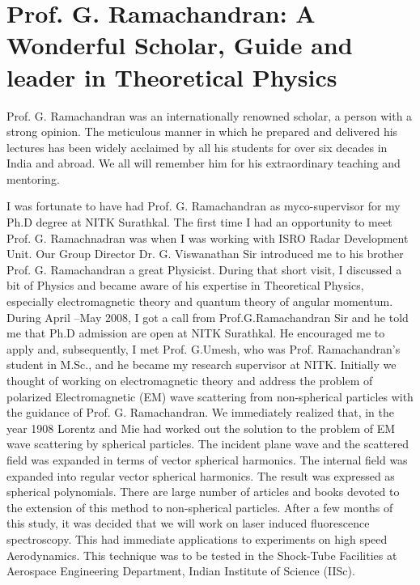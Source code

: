 \chapter[A Wonderful Scholar, Guide and leader in Theoretical Physics]{Prof. G. Ramachandran: A Wonderful Scholar, Guide and leader in Theoretical Physics}

\vspace{-.4cm}

Prof. G. Ramachandran was an internationally renowned scholar, a person with a strong opinion. The meticulous manner in which he prepared and delivered his lectures has been widely acclaimed by all his students for over six decades in India and abroad. We all will remember him for his extraordinary teaching and mentoring.

\medskip

I was fortunate to have had Prof. G. Ramachandran as my\break co-supervisor for my Ph.D degree at NITK Surathkal. The first time I had an opportunity to meet Prof. G. Ramachnadran was when I was working with ISRO Radar Development Unit. Our Group Director Dr. G. Viswanathan Sir introduced me to his brother Prof. G. Ramachandran a great Physicist. During that short visit, I discussed a bit of Physics and became aware of his expertise in Theoretical Physics, especially electromagnetic theory and quantum theory of angular momentum. During April --May 2008, I got a call from Prof.G.Ramachandran Sir and he told me that Ph.D admission are open at NITK Surathkal. He encouraged me to apply and, subsequently, I met Prof. G.Umesh, who was Prof. Ramachandran's student in M.Sc., and he became my research supervisor at NITK. Initially we thought of working on electromagnetic theory and address the problem of polarized Electromagnetic (EM) wave scattering from non-spherical particles with the guidance of Prof. G. Ramachandran. We immediately realized that, in the year 1908 Lorentz and Mie had worked out the solution to the problem of EM wave scattering by spherical particles. The incident plane wave and the scattered field was expanded in terms of vector spherical harmonics. The internal field was expanded into regular vector spherical harmonics. The result was expressed as spherical polynomials. There are large number of articles and books devoted to the extension of this method to non-spherical particles. After a few months of this study, it was decided that we will work on  laser induced fluorescence spectroscopy. This had immediate applications to experiments on high speed Aerodynamics. This technique was to be tested in the Shock-Tube Facilities at Aerospace Engineering Department, Indian Institute of Science (IISc).

